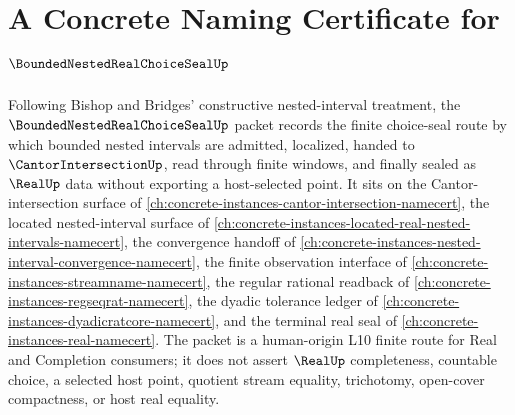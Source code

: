 \chapter{A Concrete Naming Certificate for $\BoundedNestedRealChoiceSealUp$}
\label{ch:concrete-instances-bounded-nested-real-choice-seal-namecert}

Following Bishop and Bridges' constructive nested-interval treatment, the $\BoundedNestedRealChoiceSealUp$ packet records the finite choice-seal route by which bounded nested intervals are admitted, localized, handed to $\CantorIntersectionUp$, read through finite windows, and finally sealed as $\RealUp$ data without exporting a host-selected point. It sits on the Cantor-intersection surface of \autoref{ch:concrete-instances-cantor-intersection-namecert}, the located nested-interval surface of \autoref{ch:concrete-instances-located-real-nested-intervals-namecert}, the convergence handoff of \autoref{ch:concrete-instances-nested-interval-convergence-namecert}, the finite observation interface of \autoref{ch:concrete-instances-streamname-namecert}, the regular rational readback of \autoref{ch:concrete-instances-regseqrat-namecert}, the dyadic tolerance ledger of \autoref{ch:concrete-instances-dyadicratcore-namecert}, and the terminal real seal of \autoref{ch:concrete-instances-real-namecert}. The packet is a human-origin L10 finite route for Real and Completion consumers; it does not assert $\RealUp$ completeness, countable choice, a selected host point, quotient stream equality, trichotomy, open-cover compactness, or host real equality.

